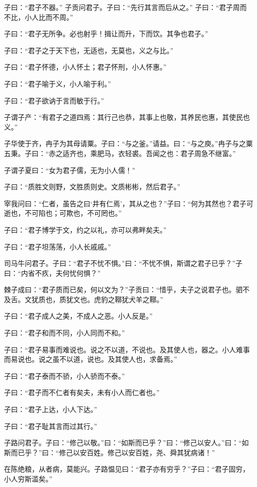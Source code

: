\documentclass[a5paper]{ctexbook}
\begin{document}
    子曰：“君子不器。”    子贡问君子。子曰：“先行其言而后从之。”    子曰：“君子周而不比，小人比而不周。”

    子曰：“君子无所争。必也射乎！揖让而升，下而饮。其争也君子。”

    子曰：“君子之于天下也，无适也，无莫也，义之与比。”

    子曰：“君子怀德，小人怀土；君子怀刑，小人怀惠。”

    子曰：“君子喻于义，小人喻于利。”

    子曰：“君子欲讷于言而敏于行。”

    子谓子产：“有君子之道四焉：其行己也恭，其事上也敬，其养民也惠，其使民也义。”

    子华使于齐，冉子为其母请粟。子曰：“与之釜。”请益。曰：“与之庾。”冉子与之粟五秉。子曰：“赤之适齐也，乘肥马，衣轻裘。吾闻之也：君子周急不继富。”

    子谓子夏曰：“女为君子儒，无为小人儒！”

    子曰：“质胜文则野，文胜质则史。文质彬彬，然后君子。”

    宰我问曰：“仁者，虽告之曰‘井有仁焉’，其从之也？”子曰：“何为其然也？君子可逝也，不可陷也；可欺也，不可罔也。”

    子曰：“君子博学于文，约之以礼，亦可以弗畔矣夫。”

    子曰：“君子坦荡荡，小人长戚戚。”

    司马牛问君子。子曰：“君子不忧不惧。”曰：“不忧不惧，斯谓之君子已乎？”子曰：“内省不疚，夫何忧何惧？”

    棘子成曰：“君子质而已矣，何以文为？”子贡曰：“惜乎，夫子之说君子也。驷不及舌。文犹质也，质犹文也。虎豹之鞹犹犬羊之鞹。”

    子曰：“君子成人之美，不成人之恶。小人反是。”

    子曰：“君子和而不同，小人同而不和。”

    子曰：“君子易事而难说也。说之不以道，不说也。及其使人也，器之。小人难事而易说也。说之虽不以道，说也。及其使人也，求备焉。”

    子曰：“君子泰而不骄，小人骄而不泰。”

    子曰：“君子而不仁者有矣夫，未有小人而仁者也。”

    子曰：“君子上达，小人下达。”

    子曰：“君子耻其言而过其行。”

    子路问君子。子曰：“修己以敬。”曰：“如斯而已乎？”曰：“修己以安人。”曰：“如斯而已乎？”曰：“修己以安百姓。修己以安百姓，尧、舜其犹病诸！”

    在陈绝粮，从者病，莫能兴。子路愠见曰：“君子亦有穷乎？”子曰：“君子固穷，小人穷斯滥矣。”
\end{document}
